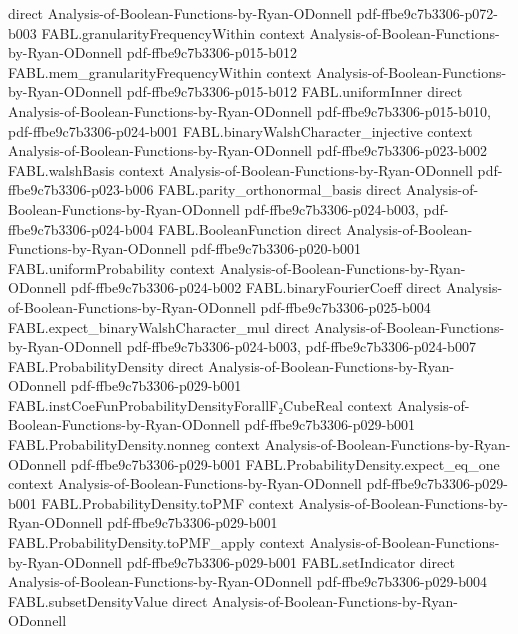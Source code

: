 \begin{theorem}
  {direct}
  {Analysis-of-Boolean-Functions-by-Ryan-ODonnell}
  {pdf-ffbe9c7b3306-p072-b003}
\proofstep
  {FABL.granularityFrequencyWithin}
  {context}
  {Analysis-of-Boolean-Functions-by-Ryan-ODonnell}
  {pdf-ffbe9c7b3306-p015-b012}
\proofstep
  {FABL.mem_granularityFrequencyWithin}
  {context}
  {Analysis-of-Boolean-Functions-by-Ryan-ODonnell}
  {pdf-ffbe9c7b3306-p015-b012}
\proofstep
  {FABL.uniformInner}
  {direct}
  {Analysis-of-Boolean-Functions-by-Ryan-ODonnell}
  {pdf-ffbe9c7b3306-p015-b010,
    pdf-ffbe9c7b3306-p024-b001}
\proofstep
  {FABL.binaryWalshCharacter_injective}
  {context}
  {Analysis-of-Boolean-Functions-by-Ryan-ODonnell}
  {pdf-ffbe9c7b3306-p023-b002}
\proofstep
  {FABL.walshBasis}
  {context}
  {Analysis-of-Boolean-Functions-by-Ryan-ODonnell}
  {pdf-ffbe9c7b3306-p023-b006}
\proofstep
  {FABL.parity_orthonormal_basis}
  {direct}
  {Analysis-of-Boolean-Functions-by-Ryan-ODonnell}
  {pdf-ffbe9c7b3306-p024-b003,
    pdf-ffbe9c7b3306-p024-b004}
\proofstep
  {FABL.BooleanFunction}
  {direct}
  {Analysis-of-Boolean-Functions-by-Ryan-ODonnell}
  {pdf-ffbe9c7b3306-p020-b001}
\proofstep
  {FABL.uniformProbability}
  {context}
  {Analysis-of-Boolean-Functions-by-Ryan-ODonnell}
  {pdf-ffbe9c7b3306-p024-b002}
\proofstep
  {FABL.binaryFourierCoeff}
  {direct}
  {Analysis-of-Boolean-Functions-by-Ryan-ODonnell}
  {pdf-ffbe9c7b3306-p025-b004}
\proofstep
  {FABL.expect_binaryWalshCharacter_mul}
  {direct}
  {Analysis-of-Boolean-Functions-by-Ryan-ODonnell}
  {pdf-ffbe9c7b3306-p024-b003,
    pdf-ffbe9c7b3306-p024-b007}
\proofstep
  {FABL.ProbabilityDensity}
  {direct}
  {Analysis-of-Boolean-Functions-by-Ryan-ODonnell}
  {pdf-ffbe9c7b3306-p029-b001}
\proofstep
  {FABL.instCoeFunProbabilityDensityForallF₂CubeReal}
  {context}
  {Analysis-of-Boolean-Functions-by-Ryan-ODonnell}
  {pdf-ffbe9c7b3306-p029-b001}
\proofstep
  {FABL.ProbabilityDensity.nonneg}
  {context}
  {Analysis-of-Boolean-Functions-by-Ryan-ODonnell}
  {pdf-ffbe9c7b3306-p029-b001}
\proofstep
  {FABL.ProbabilityDensity.expect_eq_one}
  {context}
  {Analysis-of-Boolean-Functions-by-Ryan-ODonnell}
  {pdf-ffbe9c7b3306-p029-b001}
\proofstep
  {FABL.ProbabilityDensity.toPMF}
  {context}
  {Analysis-of-Boolean-Functions-by-Ryan-ODonnell}
  {pdf-ffbe9c7b3306-p029-b001}
\proofstep
  {FABL.ProbabilityDensity.toPMF_apply}
  {context}
  {Analysis-of-Boolean-Functions-by-Ryan-ODonnell}
  {pdf-ffbe9c7b3306-p029-b001}
\proofstep
  {FABL.setIndicator}
  {direct}
  {Analysis-of-Boolean-Functions-by-Ryan-ODonnell}
  {pdf-ffbe9c7b3306-p029-b004}
\proofstep
  {FABL.subsetDensityValue}
  {direct}
  {Analysis-of-Boolean-Functions-by-Ryan-ODonnell}

\end{theorem}
